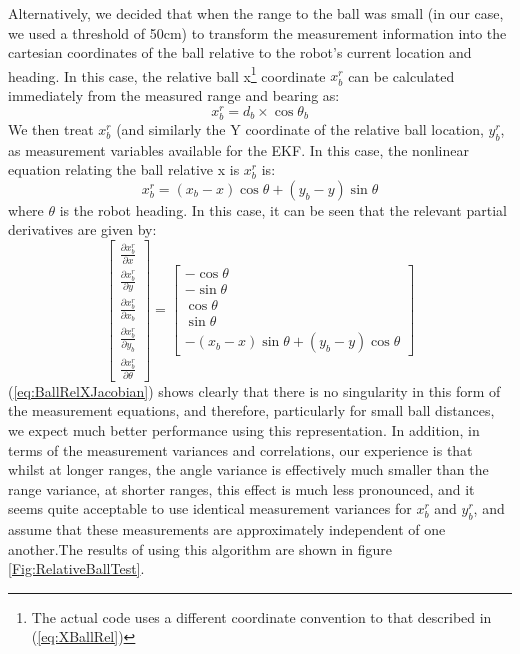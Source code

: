 Alternatively, we decided that when the range to the ball was small
(in our case, we used a threshold of 50cm) to transform the
measurement information into the cartesian coordinates of the ball
relative to the robot's current location and heading. In this case,
the relative ball x\footnote{The actual code uses a different
coordinate convention to that described in (\ref{eq:XBallRel})}
coordinate $x_b^r$ can be calculated immediately from the measured
range and bearing as:
\begin{equation}\label{eq:XBallRel}
    x_b^r=d_b \times \cos \theta_b
\end{equation}
We then treat $x_b^r$ (and similarly the Y coordinate of the
relative ball location, $y_b^r$, as measurement variables available
for the EKF. In this case, the nonlinear equation relating the ball
relative x is $x_b^r$ is:
\begin{equation}\label{eq:XBallRelStates}
    x_b^r=(x_b-x)\cos\theta + (y_b-y)\sin\theta
\end{equation}
where $\theta$ is the robot heading. In this case, it can be seen
that the relevant partial derivatives are given by:
\begin{equation}\label{eq:BallRelXJacobian}
    \left[\begin{array}{c}
            \frac{\partial x_b^r}{\partial x} \\
            \frac{\partial x_b^r}{\partial y}  \\
            \frac{\partial x_b^r}{\partial x_b}  \\
            \frac{\partial x_b^r}{\partial y_b} \\
            \frac{\partial x_b^r}{\partial \theta}
          \end{array}
    \right] =
\left[\begin{array}{c}
            -\cos\theta \\
            -\sin\theta   \\
            \cos\theta   \\
            \sin\theta\\
            -(x_b-x)\sin\theta + (y_b-y)\cos\theta
          \end{array}
    \right]
\end{equation}
(\ref{eq:BallRelXJacobian}) shows clearly that there is no
singularity in this form of the measurement equations, and
therefore, particularly for small ball distances, we expect much
better performance using this representation. In addition, in terms
of the measurement variances and correlations, our experience is
that whilst at longer ranges, the angle variance is effectively much
smaller than the range variance, at shorter ranges, this effect is
much less pronounced, and it seems quite acceptable to use identical
measurement variances for $x_b^r$ and $y_b^r$, and assume that these
measurements are approximately independent of one another.The results of using this algorithm are shown in
figure \ref{Fig:RelativeBallTest}.


